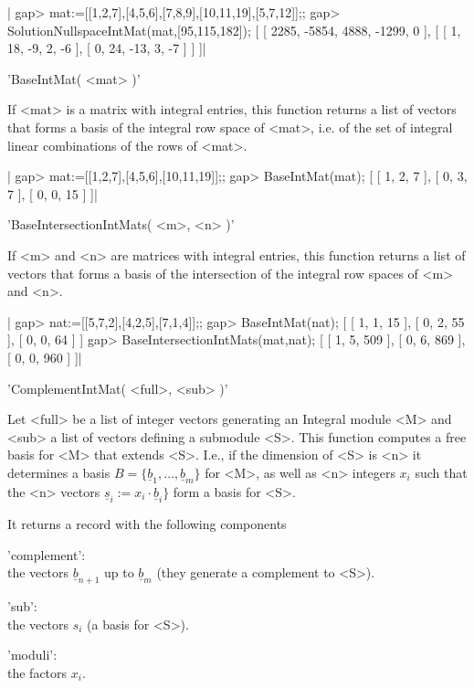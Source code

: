 |    gap> mat:=[[1,2,7],[4,5,6],[7,8,9],[10,11,19],[5,7,12]];;
    gap> SolutionNullspaceIntMat(mat,[95,115,182]);
    [ [ 2285, -5854, 4888, -1299, 0 ],
      [ [ 1, 18, -9, 2, -6 ], [ 0, 24, -13, 3, -7 ] ] ]|

'BaseIntMat( <mat> )'

If <mat> is a matrix with integral entries, this function returns a list of
vectors  that forms a basis of the integral row space of <mat>, i.e. of the
set of integral linear combinations of the rows of <mat>.

|    gap> mat:=[[1,2,7],[4,5,6],[10,11,19]];;
    gap> BaseIntMat(mat);
    [ [ 1, 2, 7 ], [ 0, 3, 7 ], [ 0, 0, 15 ] ]|

'BaseIntersectionIntMats( <m>, <n> )'

If  <m> and <n> are matrices with integral entries, this function returns a
list  of vectors that forms a basis of the intersection of the integral row
spaces of <m> and <n>.

|    gap> nat:=[[5,7,2],[4,2,5],[7,1,4]];;
    gap> BaseIntMat(nat);
    [ [ 1, 1, 15 ], [ 0, 2, 55 ], [ 0, 0, 64 ] ]
    gap> BaseIntersectionIntMats(mat,nat);
    [ [ 1, 5, 509 ], [ 0, 6, 869 ], [ 0, 0, 960 ] ]|

'ComplementIntMat( <full>, <sub> )'

Let  <full> be a list of integer  vectors generating an Integral module <M>
and  <sub>  a  list  of  vectors  defining  a  submodule <S>. This function
computes  a free basis for <M> that  extends <S>. I.e., if the dimension of
<S> is <n> it determines a basis
$B=\{\underline{b}_1,\ldots,\underline{b}_m\}$  for  <M>,  as  well  as <n>
integers   $x_i$  such  that  the  <n>  vectors  $\underline{s}_i:=x_i\cdot
\underline{b}_i\}$ form a basis for <S>.

It returns a record with the following components\:

'complement':\\
   the vectors $\underline{b}_{n+1}$ up to $\underline{b}_m$ (they
   generate a complement to <S>).

'sub':\\
   the vectors $s_i$ (a basis for <S>).

'moduli':\\
   the factors $x_i$.

